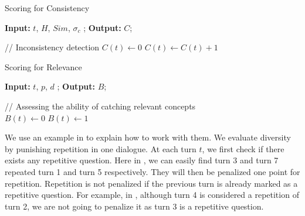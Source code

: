 \begin{algorithm}[th]
\small
\caption{Scoring for Consistency}
\label{algo:inconsist}
\hspace*{0.02in} {\bf Input:}
$t$, $H$, $Sim$, $\sigma_{c}$
; \hspace*{0.02in} {\bf Output:  } 
 $C$;
\begin{algorithmic}[1]
\State // Inconsistency detection
\State $C(t) \leftarrow  0$
    \State $C(t) \leftarrow C(t) + 1$
   \EndIf
  \EndIf
\end{algorithmic}
\end{algorithm}

\begin{algorithm}[th]
\small
\caption{Scoring for Relevance}
\label{algo:bonus}
\hspace*{0.02in} {\bf Input:}
$t$, $p$, $d$
; \hspace*{0.02in} {\bf Output:  } 
$B$;
\begin{algorithmic}[1]
\State // Assessing the ability of catching relevant concepts\\
$B(t) \leftarrow 0$
   \State $B(t) \leftarrow 1$
  \EndIf
 \EndFor
\end{algorithmic}
\end{algorithm}

We use an example in 
to explain how to work with them.
We evaluate diversity by punishing
repetition in one dialogue.
 At each turn $t$, we first check if there exists any repetitive question.  
Here in ,
we can easily find turn 3 and turn 7 repeated turn 1 and turn 5 
respectively. They will then be penalized one point for repetition. 
Repetition is not penalized if the previous turn is already 
marked as a repetitive question. For example, in , 
although turn 4 is considered a repetition of turn 2,  
we are not going to penalize it as turn 3 is a repetitive question. 

